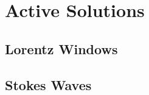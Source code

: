 \documentclass[twocolumn]{article}
\begin{document}
\section{Active Solutions} \label{sec:Solutions}
\subsection*{Lorentz Windows}
\subsection*{Stokes Waves}



\end{document}
